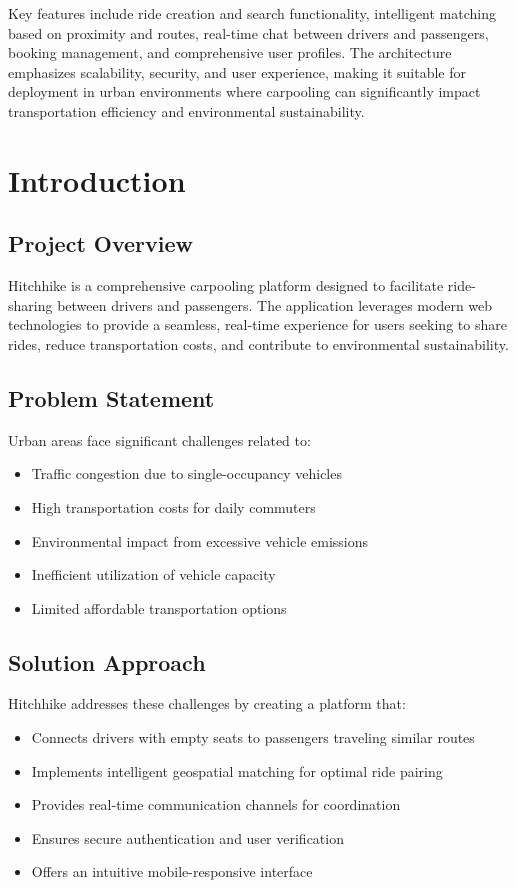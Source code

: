 \documentclass[12pt,a4paper]{article}
\begin{document}
Key features include ride creation and search functionality, intelligent matching based on proximity and routes, real-time chat between drivers and passengers, booking management, and comprehensive user profiles. The architecture emphasizes scalability, security, and user experience, making it suitable for deployment in urban environments where carpooling can significantly impact transportation efficiency and environmental sustainability.

\newpage

\section{Introduction}

\subsection{Project Overview}
Hitchhike is a comprehensive carpooling platform designed to facilitate ride-sharing between drivers and passengers. The application leverages modern web technologies to provide a seamless, real-time experience for users seeking to share rides, reduce transportation costs, and contribute to environmental sustainability.

\subsection{Problem Statement}
Urban areas face significant challenges related to:
\begin{itemize}
    \item Traffic congestion due to single-occupancy vehicles
    \item High transportation costs for daily commuters
    \item Environmental impact from excessive vehicle emissions
    \item Inefficient utilization of vehicle capacity
    \item Limited affordable transportation options
\end{itemize}

\subsection{Solution Approach}
Hitchhike addresses these challenges by creating a platform that:
\begin{itemize}
    \item Connects drivers with empty seats to passengers traveling similar routes
    \item Implements intelligent geospatial matching for optimal ride pairing
    \item Provides real-time communication channels for coordination
    \item Ensures secure authentication and user verification
    \item Offers an intuitive mobile-responsive interface
\end{itemize}
\end{document}
